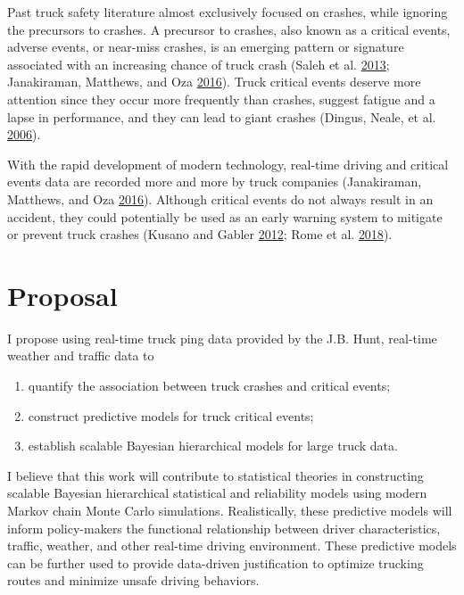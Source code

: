\documentclass[12pt]{book}
\numberwithin{equation}{chapter}
\providecommand{\tightlist}{%
  \setlength{\itemsep}{0pt}\setlength{\parskip}{0pt}}
\begin{document}
Past truck safety literature almost exclusively focused on crashes, while ignoring the precursors to crashes. A precursor to crashes, also known as a critical events, adverse events, or near-miss crashes, is an emerging pattern or signature associated with an increasing chance of truck crash (Saleh et al. \protect\hyperlink{ref-saleh2013accident}{2013}; Janakiraman, Matthews, and Oza \protect\hyperlink{ref-janakiraman2016discovery}{2016}). Truck critical events deserve more attention since they occur more frequently than crashes, suggest fatigue and a lapse in performance, and they can lead to giant crashes (Dingus, Neale, et al. \protect\hyperlink{ref-dingus2006development}{2006}).

With the rapid development of modern technology, real-time driving and critical events data are recorded more and more by truck companies (Janakiraman, Matthews, and Oza \protect\hyperlink{ref-janakiraman2016discovery}{2016}). Although critical events do not always result in an accident, they could potentially be used as an early warning system to mitigate or prevent truck crashes (Kusano and Gabler \protect\hyperlink{ref-kusano2012safety}{2012}; Rome et al. \protect\hyperlink{ref-de2018near}{2018}).

\hypertarget{proposal}{%
\section{Proposal}\label{proposal}}

I propose using real-time truck ping data provided by the J.B. Hunt, real-time weather and traffic data to

\begin{enumerate}
\def\labelenumi{\arabic{enumi})}
\tightlist
\item
  quantify the association between truck crashes and critical events;
\item
  construct predictive models for truck critical events;
\item
  establish scalable Bayesian hierarchical models for large truck data.
\end{enumerate}

I believe that this work will contribute to statistical theories in constructing scalable Bayesian hierarchical statistical and reliability models using modern Markov chain Monte Carlo simulations. Realistically, these predictive models will inform policy-makers the functional relationship between driver characteristics, traffic, weather, and other real-time driving environment. These predictive models can be further used to provide data-driven justification to optimize trucking routes and minimize unsafe driving behaviors.
\end{document}
